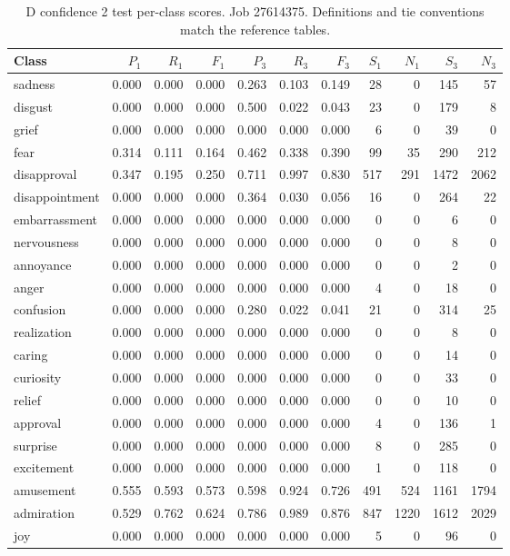 \begin{table}[!htbp]
\centering
\scriptsize
\setlength{\tabcolsep}{5pt}
\begin{tabular}{lrrrrrrrrrr}
\toprule
Class & $P_1$ & $R_1$ & $F_1$ & $P_3$ & $R_3$ & $F_3$ & $S_1$ & $N_1$ & $S_3$ & $N_3$ \\
\midrule
sadness & 0.000 & 0.000 & 0.000 & 0.263 & 0.103 & 0.149 & 28 & 0 & 145 & 57 \\
disgust & 0.000 & 0.000 & 0.000 & 0.500 & 0.022 & 0.043 & 23 & 0 & 179 & 8 \\
grief & 0.000 & 0.000 & 0.000 & 0.000 & 0.000 & 0.000 & 6 & 0 & 39 & 0 \\
fear & 0.314 & 0.111 & 0.164 & 0.462 & 0.338 & 0.390 & 99 & 35 & 290 & 212 \\
disapproval & 0.347 & 0.195 & 0.250 & 0.711 & 0.997 & 0.830 & 517 & 291 & 1472 & 2062 \\
disappointment & 0.000 & 0.000 & 0.000 & 0.364 & 0.030 & 0.056 & 16 & 0 & 264 & 22 \\
embarrassment & 0.000 & 0.000 & 0.000 & 0.000 & 0.000 & 0.000 & 0 & 0 & 6 & 0 \\
nervousness & 0.000 & 0.000 & 0.000 & 0.000 & 0.000 & 0.000 & 0 & 0 & 8 & 0 \\
annoyance & 0.000 & 0.000 & 0.000 & 0.000 & 0.000 & 0.000 & 0 & 0 & 2 & 0 \\
anger & 0.000 & 0.000 & 0.000 & 0.000 & 0.000 & 0.000 & 4 & 0 & 18 & 0 \\
confusion & 0.000 & 0.000 & 0.000 & 0.280 & 0.022 & 0.041 & 21 & 0 & 314 & 25 \\
realization & 0.000 & 0.000 & 0.000 & 0.000 & 0.000 & 0.000 & 0 & 0 & 8 & 0 \\
caring & 0.000 & 0.000 & 0.000 & 0.000 & 0.000 & 0.000 & 0 & 0 & 14 & 0 \\
curiosity & 0.000 & 0.000 & 0.000 & 0.000 & 0.000 & 0.000 & 0 & 0 & 33 & 0 \\
relief & 0.000 & 0.000 & 0.000 & 0.000 & 0.000 & 0.000 & 0 & 0 & 10 & 0 \\
approval & 0.000 & 0.000 & 0.000 & 0.000 & 0.000 & 0.000 & 4 & 0 & 136 & 1 \\
surprise & 0.000 & 0.000 & 0.000 & 0.000 & 0.000 & 0.000 & 8 & 0 & 285 & 0 \\
excitement & 0.000 & 0.000 & 0.000 & 0.000 & 0.000 & 0.000 & 1 & 0 & 118 & 0 \\
amusement & 0.555 & 0.593 & 0.573 & 0.598 & 0.924 & 0.726 & 491 & 524 & 1161 & 1794 \\
admiration & 0.529 & 0.762 & 0.624 & 0.786 & 0.989 & 0.876 & 847 & 1220 & 1612 & 2029 \\
joy & 0.000 & 0.000 & 0.000 & 0.000 & 0.000 & 0.000 & 5 & 0 & 96 & 0 \\
\bottomrule
\end{tabular}
\caption{D confidence 2 test per-class scores. Job 27614375. Definitions and tie conventions match the reference tables.}
\label{tab:classes-d_confidence_k2}
\end{table}
